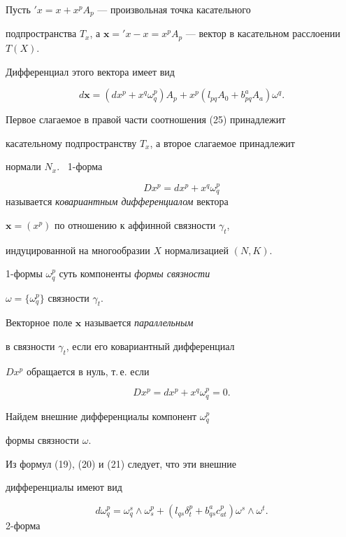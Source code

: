 Пусть ${}'x = x + x^p A_p$ --- произвольная точка касательного


подпространства $T_x$, а $\boldsymbol{x} = {}'x - x =


 x^p A_p$ --- вектор в касательном расслоении $T(X)$.


 Дифференциал этого вектора имеет вид


\begin{equation}\label{eq:34}


 d\boldsymbol{x} =


 (dx^p + x^q \omega_q^p) A_p + x^p (l_{pq} A_0 + b^a_{pq} A_a) \omega^q.


\end{equation}


Первое слагаемое в правой части соотношения (25) принадлежит


касательному подпространству $T_x$, а второе слагаемое принадлежит


нормали $N_x$. \ 1-форма


$$


D x^p = dx^p + x^q \omega_q^p


$$
называется {\it ковариантным дифференциалом} вектора


$\boldsymbol{x} = (x^p)$ по отношению к аффинной связности $\gamma_t$,


индуцированной на многообразии $X$ нормализацией $(N, K)$.


 1-формы $\omega_q^p$ суть компоненты {\it формы связности}


$\omega =\{\omega_q^p\}$ связности $\gamma_t$.





Векторное поле $\boldsymbol{x}$ называется {\it параллельным}


в связности $\gamma_t$, если его ковариантный дифференциал


$Dx^p$ обращается в нуль, т.\,е. если


$$


Dx^p = dx^p + x^q \omega_q^p = 0.


$$

Найдем внешние дифференциалы компонент $\omega_q^p$


формы связности $\omega$.


Из формул (19), (20) и (21) следует, что эти внешние


дифференциалы имеют вид


\begin{equation}\label{eq:36}


d \omega_q^p = \omega_q^s \wedge \omega_s^p + (l_{qs} \delta_t^p +
b^a_{qs} c_{at}^p) \omega^s \wedge \omega^t.
\end{equation}
2-форма


